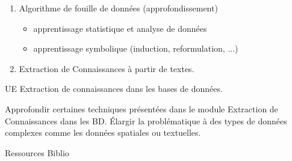 \vfill

{
\begin{enumerate} 
\item Algorithme de fouille de données (approfondissement)
\begin{itemize} 
\item apprentissage statistique et analyse de données
\item apprentissage symbolique (induction, reformulation, ...)
\end{itemize} 
\item Extraction de Connaissances à partir de textes.
\end{enumerate} 
} 
{UE Extraction de connaissances dans les bases de données.} 
{\begin{itemize} 
\ObjItem Approfondir certaines techniques présentées dans le module Extraction de Connaissances dans les BD.
\ObjItem Élargir la problématique à des types de données complexes comme les données spatiales ou textuelles.
\end{itemize} 
} 
{Ressources} 
{Biblio} 
 
\vfill

